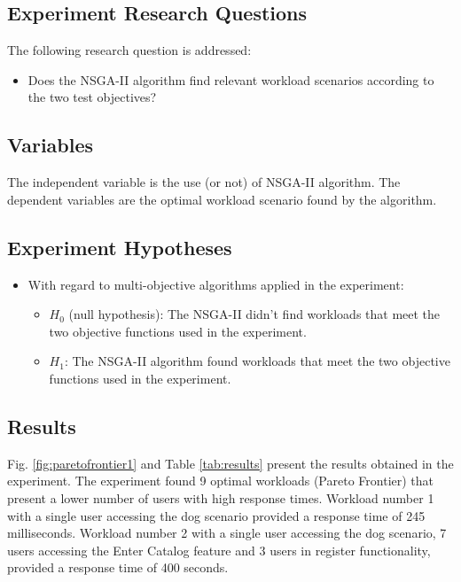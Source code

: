 \documentclass[espaco=umemeio,chapter=TITLE,twoside,openright]{abnt}
\begin{document}
\subsection{Experiment Research Questions}

The following research question is addressed:
\begin{itemize}
\item Does the NSGA-II algorithm find relevant workload scenarios according to the two test objectives?
\end{itemize}

\subsection{Variables}

The independent variable is the use (or not) of NSGA-II algorithm. The dependent variables are the optimal workload scenario found by the algorithm.

\subsection{Experiment Hypotheses}

\begin{itemize}
\item With regard to multi-objective algorithms applied in the experiment:
\begin{itemize}
\item $H_{0}$ (null hypothesis): The NSGA-II didn't find workloads that meet the two objective functions used in the experiment.
\item $H_{1}$: The NSGA-II  algorithm found workloads that meet the two objective functions used in the experiment.
\end{itemize}
\end{itemize}


\subsection{Results}

Fig. \ref{fig:paretofrontier1} and Table \ref{tab:results} present the results obtained in the experiment. The experiment found 9 optimal workloads (Pareto Frontier) that present a lower number of users with high response times. Workload number 1 with a single user accessing the dog scenario provided a response time of 245 milliseconds.  Workload number 2 with a single user accessing the dog scenario, 7 users accessing the Enter Catalog feature and 3 users in register functionality, provided a response time of 400 seconds.
\end{document}
